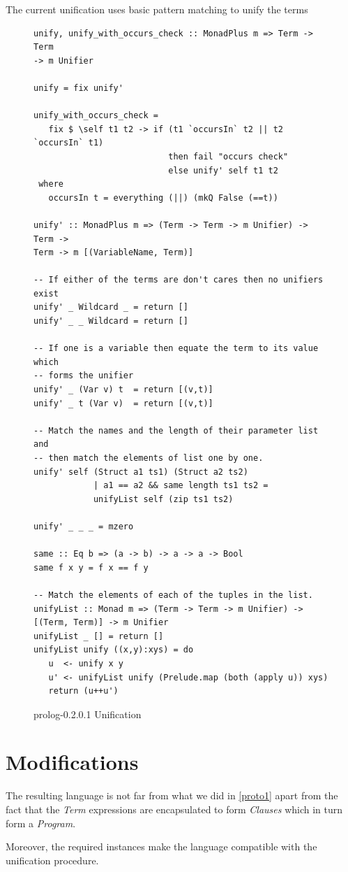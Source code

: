 \documentclass[thesis-solanki.tex]{subfiles}
\begin{document}
The current unification uses basic pattern matching to unify the terms 
\begin{figure}[h]
\begin{verbatim}
unify, unify_with_occurs_check :: MonadPlus m => Term -> Term
-> m Unifier

unify = fix unify'

unify_with_occurs_check =
   fix $ \self t1 t2 -> if (t1 `occursIn` t2 || t2 `occursIn` t1)
                           then fail "occurs check"
                           else unify' self t1 t2
 where
   occursIn t = everything (||) (mkQ False (==t))

unify' :: MonadPlus m => (Term -> Term -> m Unifier) -> Term ->
Term -> m [(VariableName, Term)]

-- If either of the terms are don't cares then no unifiers exist
unify' _ Wildcard _ = return []
unify' _ _ Wildcard = return []

-- If one is a variable then equate the term to its value which
-- forms the unifier
unify' _ (Var v) t  = return [(v,t)]
unify' _ t (Var v)  = return [(v,t)]

-- Match the names and the length of their parameter list and
-- then match the elements of list one by one.
unify' self (Struct a1 ts1) (Struct a2 ts2)
            | a1 == a2 && same length ts1 ts2 =
            unifyList self (zip ts1 ts2)

unify' _ _ _ = mzero

same :: Eq b => (a -> b) -> a -> a -> Bool
same f x y = f x == f y

-- Match the elements of each of the tuples in the list.
unifyList :: Monad m => (Term -> Term -> m Unifier) ->
[(Term, Term)] -> m Unifier
unifyList _ [] = return []
unifyList unify ((x,y):xys) = do
   u  <- unify x y
   u' <- unifyList unify (Prelude.map (both (apply u)) xys)
   return (u++u')
\end{verbatim} 
\caption{prolog-0.2.0.1 Unification}
\label{tab:prlg0201unif}
\end{figure}

\clearpage
\section{Modifications}
The resulting language is not far from what we did in \ref{proto1} apart from the fact that the \textit{Term} expressions are encapsulated
to form \textit{Clauses} which in turn form a \textit{Program}.

Moreover, the required instances make the language compatible with the unification procedure.
\end{document}
